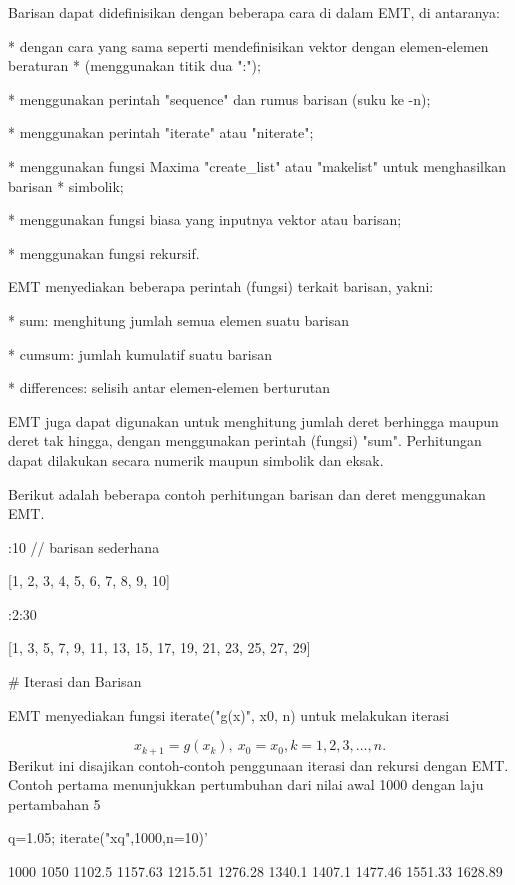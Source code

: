 \documentclass{article}
\begin{document}
Barisan dapat didefinisikan dengan beberapa cara di dalam EMT, di antaranya:


* 
dengan cara yang sama seperti mendefinisikan vektor dengan elemen-elemen beraturan
* (menggunakan titik dua ":");

* 
menggunakan perintah "sequence" dan rumus barisan (suku ke -n);

* 
menggunakan perintah "iterate" atau "niterate";

* 
menggunakan fungsi Maxima "create_list" atau "makelist" untuk menghasilkan barisan
* simbolik;

* 
menggunakan fungsi biasa yang inputnya vektor atau barisan;

* 
menggunakan fungsi rekursif.


EMT menyediakan beberapa perintah (fungsi) terkait barisan, yakni:


* 
sum: menghitung jumlah semua elemen suatu barisan

* 
cumsum: jumlah kumulatif suatu barisan

* 
differences: selisih antar elemen-elemen berturutan


EMT juga dapat digunakan untuk menghitung jumlah deret berhingga maupun deret tak hingga,
dengan menggunakan perintah (fungsi) "sum". Perhitungan dapat dilakukan secara numerik
maupun simbolik dan eksak.


Berikut adalah beberapa contoh perhitungan barisan dan deret menggunakan EMT.


:10 // barisan sederhana


    [1,  2,  3,  4,  5,  6,  7,  8,  9,  10]

:2:30


    [1,  3,  5,  7,  9,  11,  13,  15,  17,  19,  21,  23,  25,  27,  29]

# Iterasi dan Barisan

EMT menyediakan fungsi iterate("g(x)", x0, n) untuk melakukan iterasi


$$x_{k+1}=g(x_k), \ x_0=x_0, k= 1, 2, 3, ..., n.$$Berikut ini disajikan contoh-contoh penggunaan iterasi dan rekursi
dengan EMT. Contoh pertama menunjukkan pertumbuhan dari nilai awal
1000 dengan laju pertambahan 5%


\>q=1.05; iterate("x\*q",1000,n=10)'


             1000 
             1050 
           1102.5 
          1157.63 
          1215.51 
          1276.28 
           1340.1 
           1407.1 
          1477.46 
          1551.33 
          1628.89 
\end{document}
